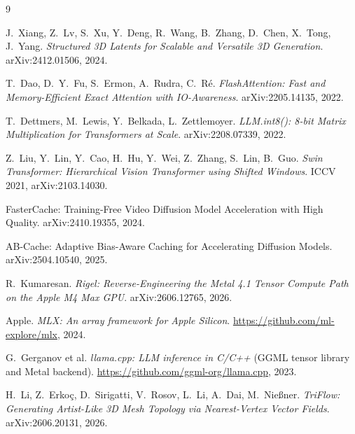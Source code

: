\documentclass{article}
\begin{document}
\begin{thebibliography}{9}

J.\ Xiang, Z.\ Lv, S.\ Xu, Y.\ Deng, R.\ Wang, B.\ Zhang, D.\ Chen, X.\ Tong, J.\ Yang.
\emph{Structured 3D Latents for Scalable and Versatile 3D Generation}.
arXiv:2412.01506, 2024.

T.\ Dao, D.\ Y.\ Fu, S.\ Ermon, A.\ Rudra, C.\ R\'{e}.
\emph{FlashAttention: Fast and Memory-Efficient Exact Attention with IO-Awareness}.
arXiv:2205.14135, 2022.

T.\ Dettmers, M.\ Lewis, Y.\ Belkada, L.\ Zettlemoyer.
\emph{LLM.int8(): 8-bit Matrix Multiplication for Transformers at Scale}.
arXiv:2208.07339, 2022.

Z.\ Liu, Y.\ Lin, Y.\ Cao, H.\ Hu, Y.\ Wei, Z.\ Zhang, S.\ Lin, B.\ Guo.
\emph{Swin Transformer: Hierarchical Vision Transformer using Shifted Windows}.
ICCV 2021, arXiv:2103.14030.

FasterCache: Training-Free Video Diffusion Model Acceleration with High Quality.
arXiv:2410.19355, 2024.

AB-Cache: Adaptive Bias-Aware Caching for Accelerating Diffusion Models.
arXiv:2504.10540, 2025.

R.\ Kumaresan.
\emph{Rigel: Reverse-Engineering the Metal 4.1 Tensor Compute Path on the Apple M4 Max GPU}.
arXiv:2606.12765, 2026.

Apple.
\emph{MLX: An array framework for Apple Silicon}.
\url{https://github.com/ml-explore/mlx}, 2024.

G.\ Gerganov et al.
\emph{llama.cpp: LLM inference in C/C++} (GGML tensor library and Metal backend).
\url{https://github.com/ggml-org/llama.cpp}, 2023.

H.\ Li, Z.\ Erko\c{c}, D.\ Sirigatti, V.\ Rosov, L.\ Li, A.\ Dai, M.\ Nie\ss{}ner.
\emph{TriFlow: Generating Artist-Like 3D Mesh Topology via Nearest-Vertex Vector Fields}.
arXiv:2606.20131, 2026.

\end{thebibliography}

\appendix
\onecolumn
\end{document}
